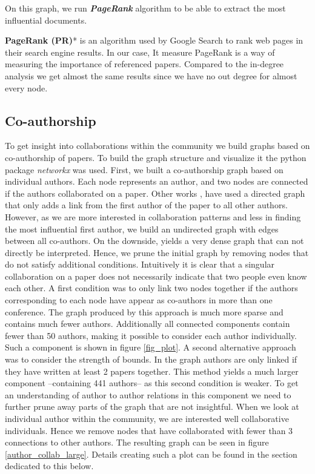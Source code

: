 \documentclass[journal,twocolumn]{IEEEtran}
\begin{document}
On this graph, we run \textbf{\emph{PageRank}} algorithm to be able to
extract the most influential documents.

\textbf{PageRank (PR)}* is an algorithm used by Google Search to rank
web pages in their search engine results. In our case, It measure
PageRank is a way of measuring the importance of referenced papers.
Compared to the in-degree analysis we get almost the same results since
we have no out degree for almost every node.



    \hypertarget{co-authorship}{%
\subsection{Co-authorship}\label{co-authorship}}

To get insight into collaborations within the community we build graphs
based on co-authorship of papers. To build the graph structure and
visualize it the python package \emph{networkx} was used. First, we
built a co-authorship graph based on individual authors. Each node
represents an author, and two nodes are connected if the authors
collaborated on a paper. Other works \cite{cheong2009social},
\cite{hesford2006management} have used a directed graph that only adds a
link from the first author of the paper to all other authors. However,
as we are more interested in collaboration patterns and less in finding
the most influential first author, we build an undirected graph with
edges between all co-authors. On the downside, yields a very dense graph
that can not directly be interpreted. Hence, we prune the initial graph
by removing nodes that do not satisfy additional conditions. Intuitively
it is clear that a singular collaboration on a paper does not
necessarily indicate that two people even know each other. A first
condition was to only link two nodes together if the authors
corresponding to each node have appear as co-authors in more than one
conference. The graph produced by this approach is much more sparse and
contains much fewer authors. Additionally all connected components
contain fewer than 50 authors, making it possible to consider each
author individually. Such a component is shown in figure \ref{fig_plot}.
A second alternative approach was to consider the strength of bounds. In
the graph authors are only linked if they have written at least 2 papers
together. This method yields a much larger component --containing 441
authors-- as this second condition is weaker. To get an understanding of
author to author relations in this component we need to further prune
away parts of the graph that are not insightful. When we look at
individual author within the community, we are interested well
collaborative individuals. Hence we remove nodes that have collaborated
with fewer than 3 connections to other authors. The resulting graph can
be seen in figure \ref{author_collab_large}. Details creating such a
plot can be found in the section dedicated to this below.
\end{document}
